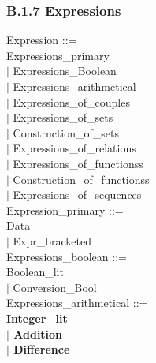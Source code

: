 \documentclass[12pt,a4paper,draft]{article}
\begin{document}
\subsubsection{B.1.7 Expressions }
\footnotesize{
\begin{sloppypar} 
\noindent Expression ::= \\
\hspace*{0.20in}   Expressions\_primary\\
\hspace*{0.20in} $|$  Expressions\_Boolean\\
\hspace*{0.20in} $|$  Expressions\_arithmetical\\
\hspace*{0.20in} $|$  Expressions\_of\_couples\\
\hspace*{0.20in} $|$  Expressions\_of\_sets\\
\hspace*{0.20in} $|$  Construction\_of\_sets\\
\hspace*{0.20in} $|$  Expressions\_of\_relations\\
\hspace*{0.20in} $|$  Expressions\_of\_functionss\\
\hspace*{0.20in} $|$  Construction\_of\_functionss\\
\hspace*{0.20in} $|$  Expressions\_of\_sequences\\
Expression\_primary ::= \\
\hspace*{0.20in}   Data\\
\hspace*{0.20in} $|$  Expr\_bracketed\\
Expressions\_boolean ::= \\
\hspace*{0.20in}   Boolean\_lit\\
\hspace*{0.20in} $|$  Conversion\_Bool\\
Expressions\_arithmetical ::= \\
\hspace*{0.20in} \textbf{ Integer\_lit \\
\hspace*{0.20in} $|$  Addition\\
\hspace*{0.20in} $|$  Difference\\
}
\end{sloppypar}}
\end{document}
